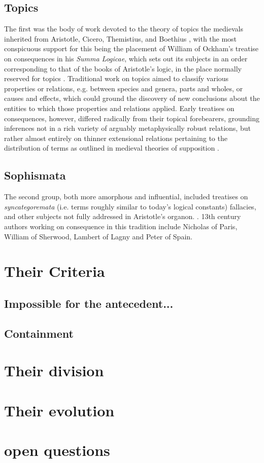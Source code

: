 \documentclass[]{article}
\begin{document}
\subsection{Topics}
The first was the body of work devoted to the theory of topics the medievals inherited from Aristotle, 
Cicero, 
Themistius, 
and Boethius \autocite{Stump1982}, 
with the most conspicuous support for this being the placement of William of Ockham's treatise on consequences in his \emph{Summa Logicae}, 
which sets out its subjects in an order corresponding to that of the books of Aristotle's logic, 
in the place normally reserved for topics \autocite{OckhamSL}. 
Traditional work on topics aimed to classify various properties or relations, 
e.g. between species and genera, 
parts and wholes, 
or causes and effects, 
which could ground the discovery of new conclusions about the entities to which those properties and relations applied. 
Early treatises on consequences, 
however, 
differed radically from their topical forebearers, 
grounding inferences not in a rich variety of arguably metaphysically robust relations, but rather almost entirely on thinner extensional relations pertaining to the distribution of terms as outlined in medieval theories of supposition \autocite{Archambault2022}. 
\subsection{Sophismata}
The second group, both more amorphous and influential, 
included treatises 
on 
\emph{syncategoremata} (i.e. terms roughly similar to today's logical constants) 
fallacies,
and other subjects not fully addressed in Aristotle's organon. 
\autocite{Green-Pedersen1984,Spruyt2018}.
13th century authors working on consequence in this tradition include 
Nicholas of Paris, 
William of Sherwood, 
Lambert of Lagny 
and Peter of Spain.

\section{Their Criteria}

\subsection{Impossible for the antecedent...}

\subsection{Containment}

\section{Their division}


\section{Their evolution}

\section{open questions}

\printbibliography
\end{document}
